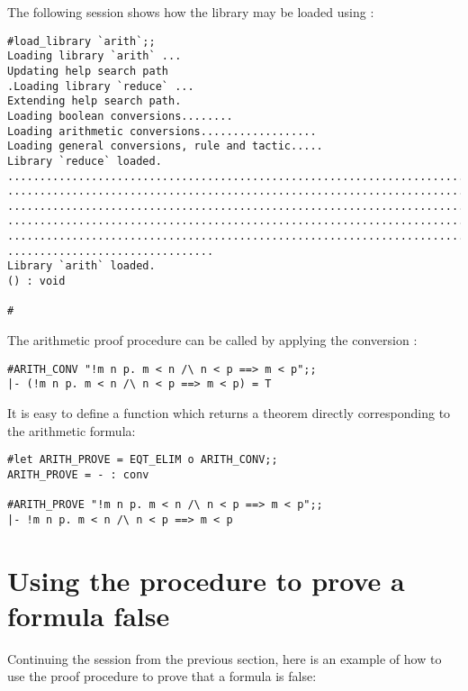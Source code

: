 The following session shows how the  library may be loaded using
:

\setcounter{sessioncount}{1}
\begin{session}\begin{verbatim}
#load_library `arith`;;
Loading library `arith` ...
Updating help search path
.Loading library `reduce` ...
Extending help search path.
Loading boolean conversions........
Loading arithmetic conversions..................
Loading general conversions, rule and tactic.....
Library `reduce` loaded.
.............................................................................
.............................................................................
.............................................................................
.............................................................................
.............................................................................
................................
Library `arith` loaded.
() : void

#
\end{verbatim}\end{session}

\noindent
The arithmetic proof procedure can be called by applying the conversion
:

\begin{session}\begin{verbatim}
#ARITH_CONV "!m n p. m < n /\ n < p ==> m < p";;
|- (!m n p. m < n /\ n < p ==> m < p) = T
\end{verbatim}\end{session}

\noindent
It is easy to define a function which returns a theorem directly corresponding
to the arithmetic formula:

\begin{session}\begin{verbatim}
#let ARITH_PROVE = EQT_ELIM o ARITH_CONV;;
ARITH_PROVE = - : conv

#ARITH_PROVE "!m n p. m < n /\ n < p ==> m < p";;
|- !m n p. m < n /\ n < p ==> m < p
\end{verbatim}\end{session}


\section{Using the procedure to prove a formula false}

Continuing the session from the previous section, here is an example of how
to use the proof procedure to prove that a formula is
false:

